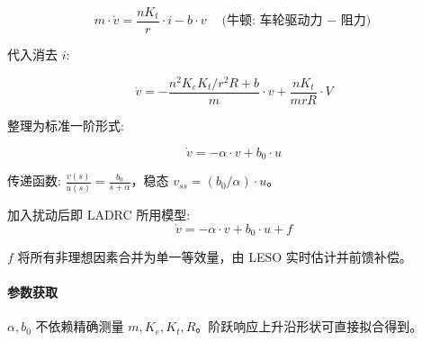 \documentclass[11pt,a4paper]{article}
\begin{document}
\begin{equation}
m \cdot \dot{v} = \frac{nK_t}{r} \cdot i - b \cdot v \quad\text{(牛顿: 车轮驱动力 $-$ 阻力)}
\end{equation}

代入消去 $i$:

\begin{equation}
\dot{v} = -\frac{n^2K_eK_t/r^2R + b}{m} \cdot v + \frac{nK_t}{mrR} \cdot V
\end{equation}

整理为标准一阶形式:

\begin{equation}
\boxed{\dot{v} = -\alpha \cdot v + b_0 \cdot u}
\end{equation}

传递函数: $\displaystyle \frac{v(s)}{u(s)} = \frac{b_0}{s + \alpha}$，稳态 $v_{ss} = (b_0/\alpha) \cdot u$。

加入扰动后即 LADRC 所用模型:
\begin{equation}
\boxed{\dot{v} = -\alpha \cdot v + b_0 \cdot u + f}
\end{equation}

$f$ 将所有非理想因素合并为单一等效量，由 LESO 实时估计并前馈补偿。

\paragraph{参数获取}

$\alpha, b_0$ 不依赖精确测量 $m, K_e, K_t, R$。阶跃响应上升沿形状可直接拟合得到。
\end{document}
